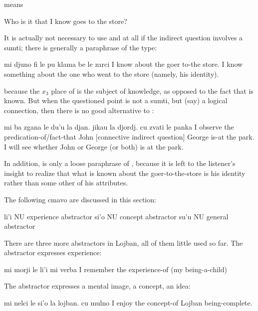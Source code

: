 {\noindent}means
\begin{example}
Who is it that I know goes to the store?
\end{example}

It is actually not necessary to use  and  at
    all if the indirect question involves a sumti; there is
    generally a paraphrase of the type:
\begin{example}
mi djuno fi le pu klama be le zarci\n
I know about the  goer to-the store.\n
I know something about the one who went to the store\n
\T	(namely, his identity).
\end{example}

{\noindent}because the $x_3$ place of  is the subject of knowledge,
    as opposed to the fact that is known. But when the questioned
    point is not a sumti, but (say) a logical connection, then
    there is no good alternative to :
\begin{example}
mi ba zgana le du'u\n
\T	la djan. jikau la djordj.\n
\T	cu zvati le panka\n
I  observe the predication-of/fact-that\n
\T	John [connective indirect question] George\n
\T	is-at the park.\n
I will see whether John or George (or both)\n
\T	is at the park.
\end{example}

In addition,  is only a loose
    paraphrase of , because it is
    left to the listener's insight to realize that what is known
    about the goer-to-the-store is his identity rather than some
    other of his attributes.



The following cmavo are discussed in this section:

   li'i    NU  experience abstractor
    si'o    NU  concept abstractor
    su'u    NU  general abstractor

There are three more abstractors in Lojban, all of them little
    used so far. The abstractor  expresses experience:
\begin{example}
mi morji le li'i mi verba\n
I remember the experience-of (my being-a-child)
\end{example}

The abstractor  expresses a mental image, a concept, an
    idea:
\begin{example}
mi nelci le si'o la lojban. cu mulno\n
I enjoy the concept-of Lojban being-complete.
\end{example}


